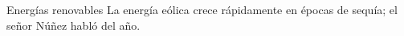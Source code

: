 \documentclass{beamer}
\begin{document}
\begin{frame}{Energías renovables}
La energía eólica crece rápidamente en épocas de sequía; el señor Núñez habló del año.
\end{frame}
\end{document}
